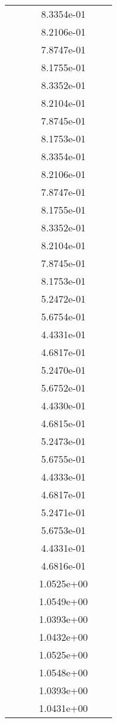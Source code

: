 \begin{xltabular}{\textwidth}{r|rS[table-format=1.3e+2]S[table-format=1.4e+2]S[table-format=1.4e+2]S[table-format=-1.5]}
&  &  & 8.3354e-01 & & \\
&  &  & 8.2106e-01 & & \\
&  &  & 7.8747e-01 & & \\
&  &  & 8.1755e-01 & & \\
&  &  & 8.3352e-01 & & \\
&  &  & 8.2104e-01 & & \\
&  &  & 7.8745e-01 & & \\
&  &  & 8.1753e-01 & & \\
&  &  & 8.3354e-01 & & \\
&  &  & 8.2106e-01 & & \\
&  &  & 7.8747e-01 & & \\
&  &  & 8.1755e-01 & & \\
&  &  & 8.3352e-01 & & \\
&  &  & 8.2104e-01 & & \\
&  &  & 7.8745e-01 & & \\
&  &  & 8.1753e-01 & & \\
&  &  & 5.2472e-01 & & \\
&  &  & 5.6754e-01 & & \\
&  &  & 4.4331e-01 & & \\
&  &  & 4.6817e-01 & & \\
&  &  & 5.2470e-01 & & \\
&  &  & 5.6752e-01 & & \\
&  &  & 4.4330e-01 & & \\
&  &  & 4.6815e-01 & & \\
&  &  & 5.2473e-01 & & \\
&  &  & 5.6755e-01 & & \\
&  &  & 4.4333e-01 & & \\
&  &  & 4.6817e-01 & & \\
&  &  & 5.2471e-01 & & \\
&  &  & 5.6753e-01 & & \\
&  &  & 4.4331e-01 & & \\
&  &  & 4.6816e-01 & & \\
&  &  & 1.0525e+00 & & \\
&  &  & 1.0549e+00 & & \\
&  &  & 1.0393e+00 & & \\
&  &  & 1.0432e+00 & & \\
&  &  & 1.0525e+00 & & \\
&  &  & 1.0548e+00 & & \\
&  &  & 1.0393e+00 & & \\
&  &  & 1.0431e+00 & & \\

\end{xltabular}
